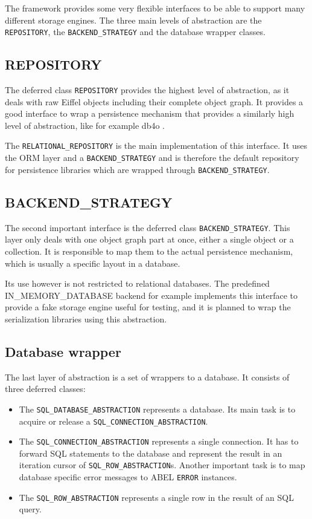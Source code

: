 The framework provides some very flexible interfaces to be able to support many different storage engines. 
The three main levels of abstraction are the \lstinline!REPOSITORY!, the \lstinline!BACKEND_STRATEGY! and the database wrapper classes.

\subsection{REPOSITORY}

The deferred class \lstinline!REPOSITORY! provides the highest level of abstraction, as it deals with raw Eiffel objects including their complete object graph.
It provides a good interface to wrap a persistence mechanism that provides a similarly high level of abstraction, like for example db4o \cite{db4o}.

The \lstinline!RELATIONAL_REPOSITORY! is the main implementation of this interface.
It uses the ORM layer and a \lstinline!BACKEND_STRATEGY! and is therefore the default repository for persistence libraries which are wrapped through \lstinline!BACKEND_STRATEGY!.

\subsection{BACKEND\_STRATEGY}

The second important interface is the deferred class \lstinline!BACKEND_STRATEGY!.
This layer only deals with one object graph part at once, either a single object or a collection.
It is responsible to map them to the actual persistence mechanism, which is usually a specific layout in a database.

Its use however is not restricted to relational databases.
The predefined IN\_MEMORY\_DATABASE backend for example implements this interface to provide a fake storage engine useful for testing, and it is planned to wrap the serialization libraries using this abstraction.

\subsection{Database wrapper}


The last layer of abstraction is a set of wrappers to a database. 
It consists of three deferred classes: 
\begin{itemize}
 \item The \lstinline!SQL_DATABASE_ABSTRACTION! represents a database. Its main task is to acquire or release a \lstinline!SQL_CONNECTION_ABSTRACTION!.
 \item The \lstinline!SQL_CONNECTION_ABSTRACTION! represents a single connection. 
It has to forward SQL statements to the database and represent the result in an iteration cursor of \lstinline!SQL_ROW_ABSTRACTION!s.
Another important task is to map database specific error messages to ABEL \lstinline!ERROR! instances.
  \item The \lstinline!SQL_ROW_ABSTRACTION! represents a single row in the result of an SQL query.
\end{itemize}

